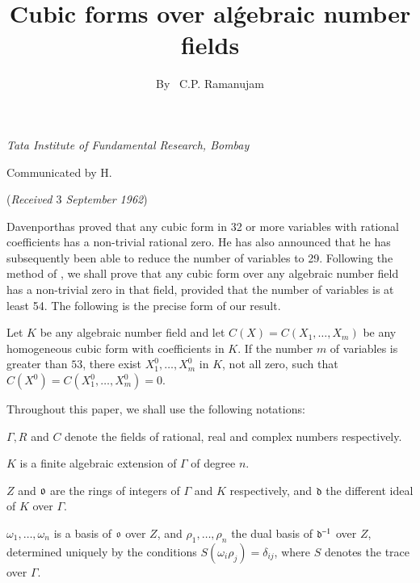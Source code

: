 \title{Cubic forms over al\'gebraic number fields}\label{chap2}

\author{By~ C.P. Ramanujam}

\date{}
\maketitle

\begin{center}
{\large\em Tata Institute of Fundamental Research, Bombay}
\medskip

{\large Communicated by H. }
\medskip

({\large\em Received $3$ September 1962})
\end{center}

\setcounter{page}{21}
\setcounter{pageoriginal}{20}
Davenport\pageoriginale has proved \cite{key3} that any cubic form in 32 or more variables 
with rational coefficients has a non-trivial rational zero. He has 
also announced that he has subsequently been able to reduce the number 
of variables to 29. Following the method of \cite{key3}, we shall prove that 
any cubic form over any algebraic number field has a non-trivial zero 
in that field, provided that the number of variables is at least 54. 
The following is the precise form of our result.

\begin{theorem*}
Let $K$ be any algebraic number field and let 
$C(X)=C(X_1,\ldots,X_m)$ 
be any homogeneous cubic form with coefficients in $K$. If the number 
$m$ of variables is greater than $53$, there exist $X_1^0,\ldots 
,X_m^0$ in $K$, not all zero, such that $C(X^0)=C(X_1^0,\ldots, 
X_m^0)=0$. 
\end{theorem*}

Throughout this paper, we shall use the following notations:

$\Gamma, R$ and $C$ denote the fields of rational, real and complex 
numbers respectively.

$K$ is a finite algebraic extension of $\Gamma$ of degree $n$.

$Z$ and $\mathfrak{o}$ are the rings of integers of $\Gamma$ and $K$ 
respectively, and $\mathfrak{d}$ the different ideal of $K$ over $\Gamma$.

$\omega_1,\ldots,\omega_n$ is a basis of $\mathfrak{o}$ over $Z$, and 
$\rho_1,\ldots,\rho_n$ the dual basis of $\mathfrak{d}^{-1}$ over $Z$, 
determined uniquely by the conditions $S(\omega_i\rho_j)=\delta_{ij}$, 
where $S$ denotes the trace over $\Gamma$.

